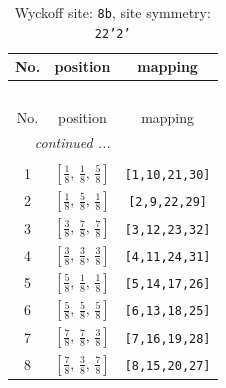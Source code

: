 \documentclass[fleqn,8pt]{jsarticle}
\begin{document}
\begin{longtable}{ccc}
\caption{Wyckoff site: {\tt 8b}, site symmetry: {\tt 22'2'}}
 \\
 \hline \hline
No. & position & mapping \\ \hline \endfirsthead

\multicolumn{2}{l}{\tablename\ \thetable{}} \\
 \hline \hline
No. & position & mapping \\ \hline \endhead

 \hline \hline
\multicolumn{2}{r}{\footnotesize\it continued ...} \\ \endfoot

 \hline \hline
\multicolumn{2}{r}{} \\ \endlastfoot

1 & $\left[ \frac{1}{8},\, \frac{1}{8},\, \frac{5}{8} \right]$ & {\tt [1,10,21,30]} \\ \hline
2 & $\left[ \frac{1}{8},\, \frac{5}{8},\, \frac{1}{8} \right]$ & {\tt [2,9,22,29]} \\ \hline
3 & $\left[ \frac{3}{8},\, \frac{7}{8},\, \frac{7}{8} \right]$ & {\tt [3,12,23,32]} \\ \hline
4 & $\left[ \frac{3}{8},\, \frac{3}{8},\, \frac{3}{8} \right]$ & {\tt [4,11,24,31]} \\ \hline
5 & $\left[ \frac{5}{8},\, \frac{1}{8},\, \frac{1}{8} \right]$ & {\tt [5,14,17,26]} \\ \hline
6 & $\left[ \frac{5}{8},\, \frac{5}{8},\, \frac{5}{8} \right]$ & {\tt [6,13,18,25]} \\ \hline
7 & $\left[ \frac{7}{8},\, \frac{7}{8},\, \frac{3}{8} \right]$ & {\tt [7,16,19,28]} \\ \hline
8 & $\left[ \frac{7}{8},\, \frac{3}{8},\, \frac{7}{8} \right]$ & {\tt [8,15,20,27]} \\
\end{longtable}
\renewcommand{\arraystretch}{1.2}
\end{document}
